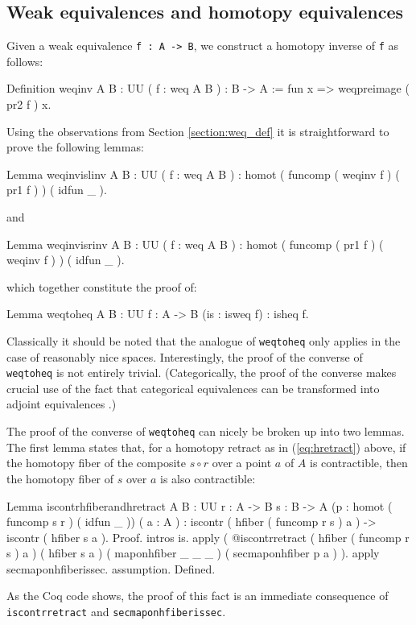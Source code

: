 \subsection{Weak equivalences and homotopy equivalences}\label{section:gradth}

Given a weak equivalence \verb|f : A -> B|, we construct a
homotopy inverse of \verb|f| as follows:
\begin{center}
  \begin{coqcode}
Definition weqinv { A B : UU } ( f : weq A B ) : B -> A := fun x => weqpreimage ( pr2 f ) x.
  \end{coqcode}
\end{center}
Using the observations from Section \ref{section:weq_def} it is
straightforward to prove the following lemmas:
\begin{center}
  \begin{coqcode}
Lemma weqinvislinv { A B : UU } ( f : weq A B ) : homot ( funcomp ( weqinv f ) ( pr1 f ) ) ( idfun _ ).
  \end{coqcode}
\end{center}
and
\begin{center}
  \begin{coqcode}
Lemma weqinvisrinv { A B : UU } ( f : weq A B ) : homot ( funcomp ( pr1 f ) ( weqinv f ) ) ( idfun _ ).
  \end{coqcode}
\end{center}
which together constitute the proof of:
\begin{center}
  \begin{coqcode}
Lemma weqtoheq { A B : UU } { f : A -> B } (is : isweq f) : isheq f.
  \end{coqcode}
\end{center}
Classically it should be noted that the analogue of 
\verb|weqtoheq| only applies in the case of reasonably nice
spaces.  Interestingly, the proof of the converse of \verb|weqtoheq| is not
entirely trivial.  (Categorically, the proof of the converse makes
crucial use of the fact that categorical equivalences can be
transformed into adjoint equivalences \cite{MacLane:1971tv}.)  

The proof of the converse of \verb|weqtoheq| can nicely be broken
up into two lemmas.  The first lemma states that, for a homotopy
retract as in (\ref{eq:hretract}) above, if the homotopy fiber of the
composite $s\circ r$ over a point $a$ of $A$ is contractible, then the
homotopy fiber of $s$ over $a$ is also contractible:
\begin{center}
  \begin{coqcode}
Lemma iscontrhfiberandhretract { A B : UU } { r : A -> B } { s : B -> A } (p : homot ( funcomp s r ) ( idfun _ )) ( a : A ) : iscontr ( hfiber ( funcomp r s ) a ) -> iscontr ( hfiber s a ).
Proof.
 intros is. 
 apply ( @iscontrretract ( hfiber ( funcomp r s ) a ) ( hfiber s a ) 
  ( maponhfiber _ _ _ ) ( secmaponhfiber p a ) ). 
 apply secmaponhfiberissec. assumption. 
Defined.    
  \end{coqcode}
\end{center}
As the Coq code shows, the proof of this fact is an immediate
consequence of \verb|iscontrretract| and
\verb|secmaponhfiberissec|.

